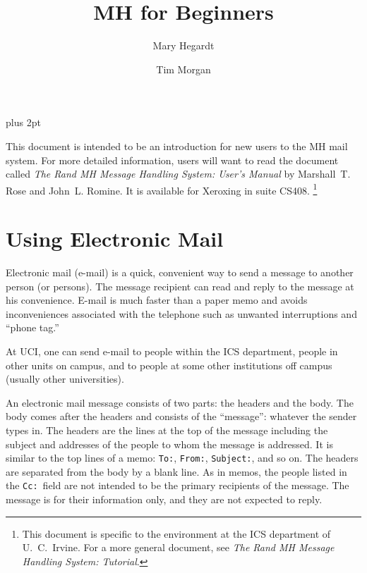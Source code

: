 \parindent=0pt
\parskip=7pt plus 2pt


\def\oneline#1{\par\bigskip\leftline{\tt\hskip.75in#1}}
\def\command#1{\par\bigskip\leftline{\tt\hskip.75in\% #1}}
\def\comarg#1#2{\par\bigskip\leftline{\tt\hskip.75in\% #1 {\it#2}}}
\def\MH/{{\sf MH}}
\def\MM/{{\sc mm}}
\def\unix/{{\sc Unix}}


\title{MH for Beginners}
\author{Mary Hegardt \and Tim Morgan}
\maketitle

This document is intended to be an introduction for new users to the
\MH/ mail system. For more detailed information, users will want to
read the document called {\sl The Rand MH Message Handling System:
User's Manual\/} by Marshall~T. Rose and John~L. Romine. It is available
for Xeroxing in suite CS408.
\footnote{This document is specific to the environment
at the ICS department of U.~C.~Irvine.  For a more general document,
see {\sl The Rand MH Message Handling System: Tutorial\/}.}

\section{Using Electronic Mail}

Electronic mail (e-mail) is a quick, convenient way to send a message
to another person (or persons).  The message recipient can read and
reply to the message at his convenience. E-mail is much faster than
a paper memo and avoids inconveniences associated with the telephone
such as unwanted interruptions and ``phone tag.''

At UCI, one can send e-mail to people within the ICS department, people
in other units on campus, and to people at some other institutions
off campus (usually other universities).

An electronic mail message consists of two parts: the headers and the
body.  The body comes after the headers and consists of the ``message'':
whatever the sender types in. The headers are the lines at the top
of the message including the subject and addresses of the people
to whom the message is addressed.  It is similar to the top lines
of a memo: {\tt To:}, {\tt From:}, {\tt Subject:}, and so on.  The headers
are separated from the body by a blank line. As in memos, the people
listed in the {\tt Cc:}\ field are not intended to be the primary recipients 
of the message. The message is for their information only, and they
are not expected to reply.



